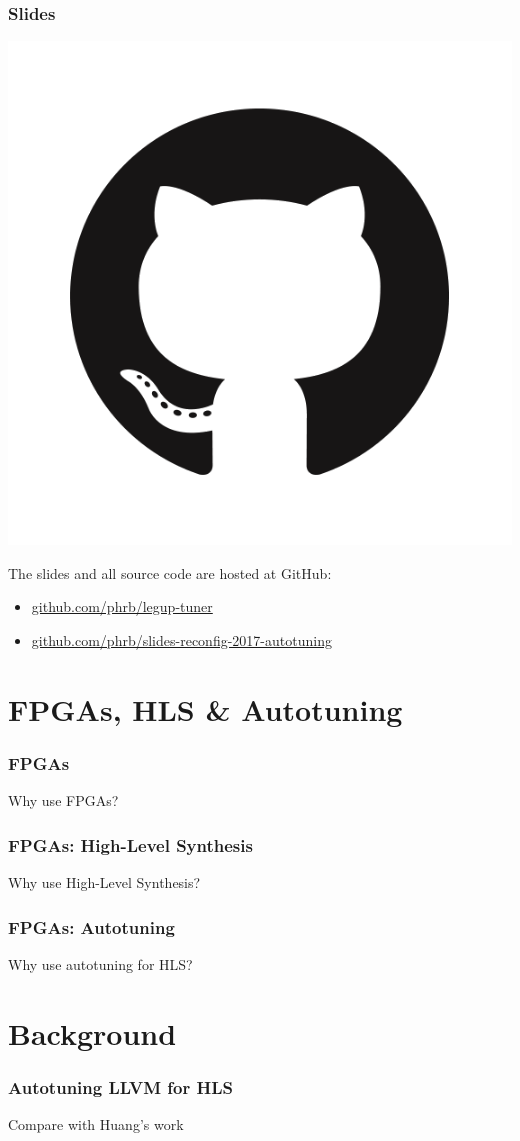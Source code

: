 \documentclass[10pt, compress, aspectratio=169]{beamer}
\begin{document}
\begin{frame}
    \frametitle{Slides}
    \begin{center}
        \includegraphics[width=.14\textwidth]{github}
    \end{center}
    The slides and all source code are hosted at \alert{GitHub}:

    \begin{itemize}
        \item \url{github.com/phrb/legup-tuner}
        \item \url{github.com/phrb/slides-reconfig-2017-autotuning}
    \end{itemize}
\end{frame}

\section{FPGAs, HLS \& Autotuning}

\begin{frame}
    \frametitle{FPGAs}
    \begin{block}{Why use FPGAs?}
    \end{block}
\end{frame}

\begin{frame}
    \frametitle{FPGAs: High-Level Synthesis}
    \begin{block}{Why use High-Level Synthesis?}
    \end{block}
\end{frame}

\begin{frame}
    \frametitle{FPGAs: Autotuning}
    \begin{block}{Why use autotuning for HLS?}
    \end{block}
\end{frame}

\section{Background}

\begin{frame}
    \frametitle{Autotuning LLVM for HLS}
    \begin{block}{Compare with Huang's work}
    \end{block}
\end{frame}
\end{document}
